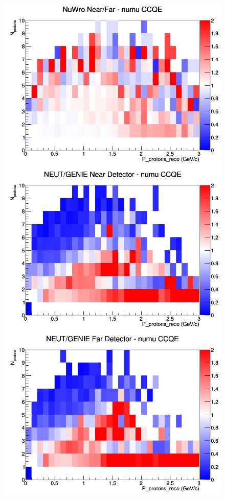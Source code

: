 \begin{figure}[h]
\endminipage
{}
\includegraphics[width=\linewidth]{eff_N_P/LAr/protons/ratios/CCQE_NuWro_numu_NF_N_P.png}
\endminipage
\newline
{}
\includegraphics[width=\linewidth]{eff_N_P/LAr/protons/ratios/CCQE_NEUT_GENIE_numu_near_N_P.png}
\endminipage
{}
\includegraphics[width=\linewidth]{eff_N_P/LAr/protons/ratios/CCQE_NEUT_GENIE_numu_far_N_P.png}

\end{figure}
